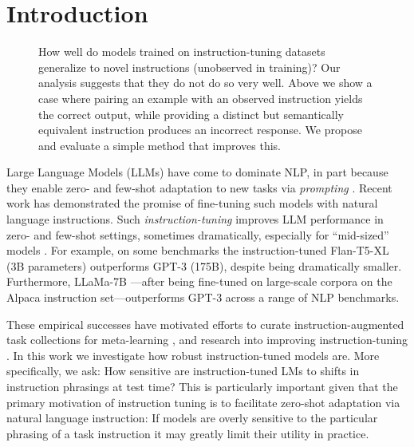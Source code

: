 \section{Introduction}

\begin{figure}[h]
  \centering
  \caption{How well do models trained on instruction-tuning datasets generalize to novel instructions (unobserved in training)? Our analysis suggests that they do not do so very well. Above we show a case where pairing an example with an observed instruction yields the correct output, while providing a distinct but semantically equivalent instruction produces an incorrect response.
    We propose and evaluate a simple method that improves this.}
  \label{fig:main_fig}
\end{figure}


Large Language Models (LLMs) have come to dominate NLP, in part because they enable zero- and few-shot adaptation to new tasks via \emph{prompting} \cite{brown2020language, chowdhery2022palm, hoffmann2022training, zeng2022glm}.
Recent work has demonstrated the promise of fine-tuning such models with natural language instructions.
Such \emph{instruction-tuning} improves LLM performance in zero- and few-shot settings, sometimes dramatically, especially for ``mid-sized'' models \cite{chung2022scaling, ouyang2022training}.
For example, on some benchmarks the instruction-tuned Flan-T5-XL (3B parameters) \cite{chung2022scaling} outperforms GPT-3 (175B), despite being dramatically smaller.
Furthermore, LLaMa-7B \cite{touvron2023llama}---after being fine-tuned on large-scale corpora on the Alpaca \cite{alpaca} instruction set---outperforms GPT-3 across a range of NLP benchmarks.

These empirical successes have motivated efforts to curate instruction-augmented task collections for meta-learning \cite{wang2022benchmarking, wei2021finetuned, wei2021finetuned}, and research into improving instruction-tuning \cite{longpre2023flan, xu2022multiinstruct, sanh2021multitask}. %
In this work we investigate how robust instruction-tuned models are.
More specifically, we ask: How sensitive are instruction-tuned LMs to shifts in instruction phrasings at test time?
This is particularly important given that the primary motivation of instruction tuning is to facilitate zero-shot adaptation via natural language instruction: If models are overly sensitive to the particular phrasing of a task instruction it may greatly limit their utility in practice.

